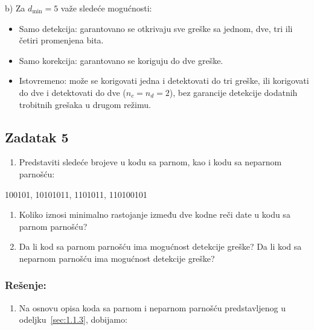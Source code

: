 \documentclass[a4paper,11pt]{article}
\numberwithin{equation}{section}
\begin{document}
b) Za $d_{\min}=5$ važe sledeće mogućnosti:

\begin{itemize}[leftmargin=*]
\item Samo detekcija: garantovano se otkrivaju sve greške sa jednom, dve, tri ili četiri promenjena bita.
\item Samo korekcija: garantovano se koriguju do dve greške.
\item Istovremeno: može se korigovati jedna i detektovati do tri greške, ili korigovati do dve i detektovati do dve ($n_c=n_d=2$), bez garancije detekcije dodatnih trobitnih grešaka u drugom režimu.
\end{itemize}



\FloatBarrier
\subsection{Zadatak 5}\label{sec:2.5}


\begin{enumerate}[label=\alph*),start=1,leftmargin=*]
\item Predstaviti sledeće brojeve u kodu sa parnom, kao i kodu sa neparnom parnošću:

\end{enumerate}


100101, 10101011, 1101011, 110100101



\begin{enumerate}[label=\alph*),start=2,leftmargin=*]
\item Koliko iznosi minimalno rastojanje između dve kodne reči date u kodu sa parnom parnošću?

\item Da li kod sa parnom parnošću ima mogućnost detekcije greške? Da li kod sa neparnom parnošću ima mogućnost detekcije greške?

\end{enumerate}


\subsubsection*{Rešenje:}


\begin{enumerate}[label=\alph*),start=1,leftmargin=*]
\item Na osnovu opisa koda sa parnom i neparnom parnošću predstavljenog u odeljku~\ref{sec:1.1.3}, dobijamo:

\end{enumerate}
\end{document}
